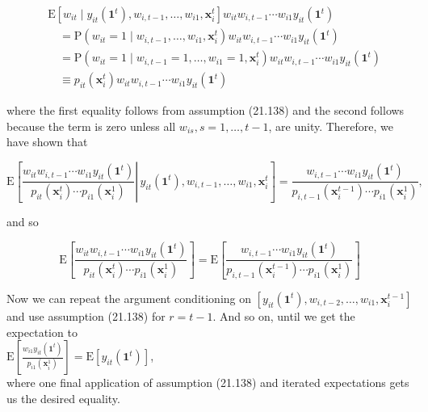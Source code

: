 \documentclass[10pt]{article}
\begin{document}
$$
\begin{aligned}
& \mathrm{E}\left[w_{i t} \mid y_{i t}\left(\mathbf{1}^{t}\right), w_{i, t-1}, \ldots, w_{i 1}, \mathbf{x}_{i}^{t}\right] w_{i t} w_{i, t-1} \cdots w_{i 1} y_{i t}\left(\mathbf{1}^{t}\right) \\
& \quad=\mathrm{P}\left(w_{i t}=1 \mid w_{i, t-1}, \ldots, w_{i 1}, \mathbf{x}_{i}^{t}\right) w_{i t} w_{i, t-1} \cdots w_{i 1} y_{i t}\left(\mathbf{1}^{t}\right) \\
& \quad=\mathrm{P}\left(w_{i t}=1 \mid w_{i, t-1}=1, \ldots, w_{i 1}=1, \mathbf{x}_{i}^{t}\right) w_{i t} w_{i, t-1} \cdots w_{i 1} y_{i t}\left(\mathbf{1}^{t}\right) \\
& \quad \equiv p_{i t}\left(\mathbf{x}_{i}^{t}\right) w_{i t} w_{i, t-1} \cdots w_{i 1} y_{i t}\left(\mathbf{1}^{t}\right)
\end{aligned}
$$

where the first equality follows from assumption (21.138) and the second follows because the term is zero unless all $w_{i s}, s=1, \ldots, t-1$, are unity. Therefore, we have shown that

$$
\mathrm{E}\left[\left.\frac{w_{i t} w_{i, t-1} \cdots w_{i 1} y_{i t}\left(\mathbf{1}^{t}\right)}{p_{i t}\left(\mathbf{x}_{i}^{t}\right) \cdots p_{i 1}\left(\mathbf{x}_{i}^{1}\right)} \right\rvert\, y_{i t}\left(\mathbf{1}^{t}\right), w_{i, t-1}, \ldots, w_{i 1}, \mathbf{x}_{i}^{t}\right]=\frac{w_{i, t-1} \cdots w_{i 1} y_{i t}\left(\mathbf{1}^{t}\right)}{p_{i, t-1}\left(\mathbf{x}_{i}^{t-1}\right) \cdots p_{i 1}\left(\mathbf{x}_{i}^{1}\right)},
$$

and so


\begin{equation*}
\mathrm{E}\left[\frac{w_{i t} w_{i, t-1} \cdots w_{i 1} y_{i t}\left(\mathbf{1}^{t}\right)}{p_{i t}\left(\mathbf{x}_{i}^{t}\right) \cdots p_{i 1}\left(\mathbf{x}_{i}^{1}\right)}\right]=\mathrm{E}\left[\frac{w_{i, t-1} \cdots w_{i 1} y_{i t}\left(\mathbf{1}^{t}\right)}{p_{i, t-1}\left(\mathbf{x}_{i}^{t-1}\right) \cdots p_{i 1}\left(\mathbf{x}_{i}^{1}\right)}\right] \tag{21.141}
\end{equation*}


Now we can repeat the argument conditioning on $\left[y_{i t}\left(\mathbf{1}^{t}\right), w_{i, t-2}, \ldots, w_{i 1}, \mathbf{x}_{i}^{t-1}\right]$ and use assumption (21.138) for $r=t-1$. And so on, until we get the expectation to\\
$\mathrm{E}\left[\frac{w_{i 1} y_{i t}\left(\mathbf{1}^{t}\right)}{p_{i 1}\left(\mathbf{x}_{i}^{1}\right)}\right]=\mathrm{E}\left[y_{i t}\left(\mathbf{1}^{t}\right)\right]$,\\
where one final application of assumption (21.138) and iterated expectations gets us the desired equality.
\end{document}
